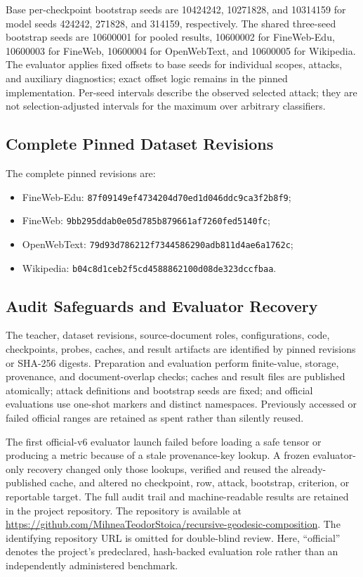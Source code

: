 \documentclass[10pt]{article}
\begin{document}
Base per-checkpoint bootstrap seeds are 10424242, 10271828, and 10314159 for
model seeds 424242, 271828, and 314159, respectively. The shared three-seed
bootstrap seeds are 10600001 for pooled results, 10600002 for FineWeb-Edu,
10600003 for FineWeb, 10600004 for OpenWebText, and 10600005 for Wikipedia.
The evaluator applies fixed offsets to base seeds for individual scopes,
attacks, and auxiliary diagnostics; exact offset logic remains in the pinned
implementation. Per-seed intervals describe the observed selected attack;
they are not selection-adjusted intervals for the maximum over arbitrary
classifiers.

\subsection{Complete Pinned Dataset Revisions}

The complete pinned revisions are:
\begin{itemize}[leftmargin=*,nosep]
\item FineWeb-Edu: \nolinkurl{87f09149ef4734204d70ed1d046ddc9ca3f2b8f9};
\item FineWeb: \nolinkurl{9bb295ddab0e05d785b879661af7260fed5140fc};
\item OpenWebText: \nolinkurl{79d93d786212f7344586290adb811d4ae6a1762c};
\item Wikipedia: \nolinkurl{b04c8d1ceb2f5cd4588862100d08de323dccfbaa}.
\end{itemize}

\subsection{Audit Safeguards and Evaluator Recovery}
The teacher, dataset revisions, source-document roles, configurations, code,
checkpoints, probes, caches, and result artifacts are identified by pinned
revisions or SHA-256 digests. Preparation and evaluation perform finite-value,
storage, provenance, and document-overlap checks; caches and result files are
published atomically; attack definitions and bootstrap seeds are fixed; and
official evaluations use one-shot markers and distinct namespaces. Previously
accessed or failed official ranges are retained as spent rather than silently
reused.

The first official-v6 evaluator launch failed before loading a safe tensor or
producing a metric because of a stale provenance-key lookup. A frozen
evaluator-only recovery changed only those lookups, verified and reused the
already-published cache, and altered no checkpoint, row, attack, bootstrap,
criterion, or reportable target. The full audit trail and machine-readable
results are retained in the project repository.
\ifdefined\papreprint
The repository is available at
\url{https://github.com/MihneaTeodorStoica/recursive-geodesic-composition}.
\else
The identifying repository URL is omitted for double-blind review.
\fi
Here, ``official'' denotes the project's predeclared, hash-backed evaluation
role rather than an independently administered benchmark.
\end{document}
